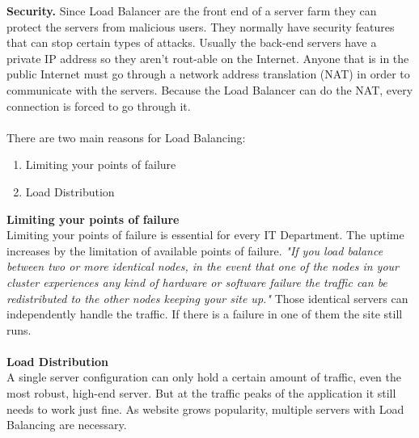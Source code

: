 \documentclass[12p]{article}
\begin{document}
	\newpage
	\textbf{Security.} Since Load Balancer are the front end of a server farm they can protect the servers from malicious users. They normally have security features that can stop certain types of attacks. Usually the back-end servers have a private IP address so they aren't rout-able on the Internet. Anyone that is in the public Internet must go through a network address translation (NAT) in order to communicate with the servers. Because the Load Balancer can do the NAT, every connection is forced to go through it.\cite{lb_SFC} \\\\
	There are two main reasons for Load Balancing:
	\begin{enumerate}
		\item Limiting your points of failure
		\item Load Distribution
		\\
	\end{enumerate}
	
	\textbf{Limiting your points of failure}\\
	Limiting your points of failure is essential for every IT Department. The uptime increases by the limitation of available points of failure. \textit{"If you load balance between two or more identical nodes, in the event that one of the nodes in your cluster experiences any kind of hardware or software failure the traffic can be redistributed to the other nodes keeping your site up."} \cite{liquidweb} Those identical servers can independently handle the traffic. If there is a failure in one of them the site still runs.
	\\\\
	\textbf{Load Distribution}\\ 
	A single server configuration can only hold a certain amount of traffic, even the most robust, high-end server. But at the traffic peaks of the application it still needs to work just fine. As website grows popularity, multiple servers with Load Balancing are necessary. \cite{liquidweb}
		
\end{document}
